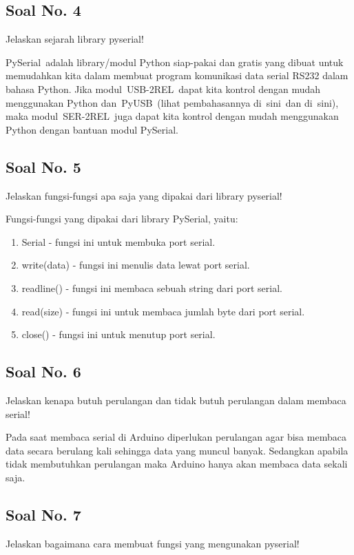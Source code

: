 \subsection{Soal No. 4}
Jelaskan sejarah library pyserial!

\hfill \break
PySerial adalah library/modul Python siap-pakai dan gratis yang dibuat untuk memudahkan kita dalam membuat program komunikasi data serial RS232 dalam bahasa Python.
Jika modul USB-2REL dapat kita kontrol dengan mudah menggunakan Python dan PyUSB (lihat pembahasannya di sini dan di sini), maka modul SER-2REL juga dapat kita kontrol dengan mudah menggunakan Python dengan bantuan modul PySerial.

\subsection{Soal No. 5}
Jelaskan fungsi-fungsi apa saja yang dipakai dari library pyserial!

\hfill \break
Fungsi-fungsi yang dipakai dari library PySerial, yaitu:
\begin{enumerate}
	\item Serial - fungsi ini untuk membuka port serial.
	\item write(data) - fungsi ini menulis data lewat port serial.
	\item readline() - fungsi ini membaca sebuah string dari port serial.
	\item read(size) - fungsi ini untuk membaca jumlah byte dari port serial.
	\item close() - fungsi ini untuk menutup port serial.
\end{enumerate}

\subsection{Soal No. 6}
Jelaskan kenapa butuh perulangan dan tidak butuh perulangan dalam membaca serial!

\hfill \break
Pada saat membaca serial di Arduino diperlukan perulangan agar bisa membaca data secara berulang kali sehingga data yang muncul banyak. Sedangkan apabila tidak membutuhkan perulangan maka Arduino hanya akan membaca data sekali saja.

\subsection{Soal No. 7}
Jelaskan bagaimana cara membuat fungsi yang mengunakan pyserial!

